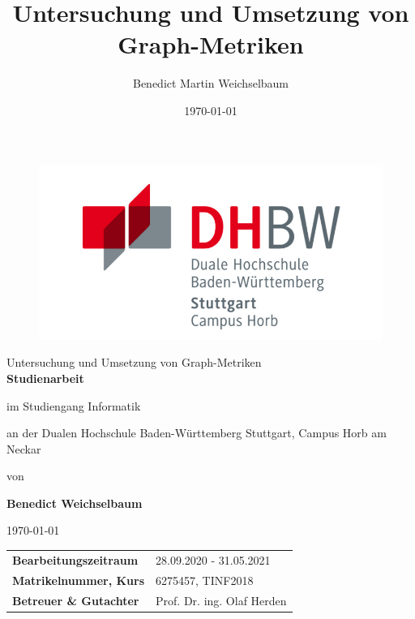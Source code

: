 \documentclass[a4paper,12pt,ngerman,chapterprefix=false,listof=totoc,bibliography=totoc]{scrreprt}
\begin{document}
\title{\Large{Untersuchung und Umsetzung von Graph-Metriken
}}
\author{Benedict Martin Weichselbaum}
\date{\today}
\begin{titlepage}
	\centering\hspace{8mm}
	\begin{figure}
		\centering
			\includegraphics[scale=1.3]{./Abbildungen/dhbwlogo.png}
	\end{figure}
	
	\vspace{5mm}	
	{\fontsize{26}{40}\selectfont
	Untersuchung und Umsetzung von Graph-Metriken
	}
	\\
	\vspace{2cm}
	\textbf{\Large{Studienarbeit}} \par
	\vspace{1cm}
	im Studiengang Informatik \par
	\vspace{0.3cm}
	an der Dualen Hochschule Baden-Württemberg Stuttgart, Campus Horb am Neckar \par
	\vspace{1.2cm}
	von \par
	\vspace{0.5cm}
	\textbf{\large{Benedict Weichselbaum}} \par
	\vspace{1.5cm}
	{\today}\par
	\vfill
	\begin{table}[ht]
		\hspace{1,5cm}
		\begin{tabular}{p{7cm}p{7cm}}
			\textbf{Bearbeitungszeitraum} & 28.09.2020 - 31.05.2021\\
			\textbf{Matrikelnummer, Kurs} & 6275457, TINF2018\\
			\textbf{Betreuer \& Gutachter} & Prof. Dr. ing. Olaf Herden\\
		\end{tabular}
	\end{table}
\end{titlepage}
\end{document}
